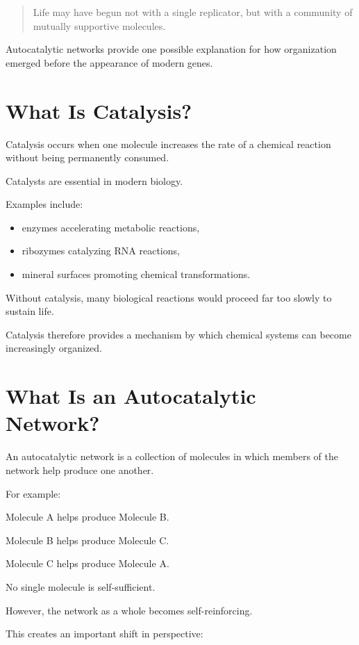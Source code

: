 \documentclass[
  oneside,
  openany]{book}
\providecommand{\tightlist}{%
  \setlength{\itemsep}{0pt}\setlength{\parskip}{0pt}}
\begin{document}
\begin{quote}
Life may have begun not with a single replicator, but with a community of mutually supportive molecules.
\end{quote}

Autocatalytic networks provide one possible explanation for how organization emerged before the appearance of modern genes.

\section{What Is Catalysis?}\label{what-is-catalysis}

Catalysis occurs when one molecule increases the rate of a chemical reaction without being permanently consumed.

Catalysts are essential in modern biology.

Examples include:

\begin{itemize}
\tightlist
\item
  enzymes accelerating metabolic reactions,
\item
  ribozymes catalyzing RNA reactions,
\item
  mineral surfaces promoting chemical transformations.
\end{itemize}

Without catalysis, many biological reactions would proceed far too slowly to sustain life.

Catalysis therefore provides a mechanism by which chemical systems can become increasingly organized.

\section{What Is an Autocatalytic Network?}\label{what-is-an-autocatalytic-network}

An autocatalytic network is a collection of molecules in which members of the network help produce one another.

For example:

Molecule A helps produce Molecule B.

Molecule B helps produce Molecule C.

Molecule C helps produce Molecule A.

No single molecule is self-sufficient.

However, the network as a whole becomes self-reinforcing.

This creates an important shift in perspective:
\end{document}
